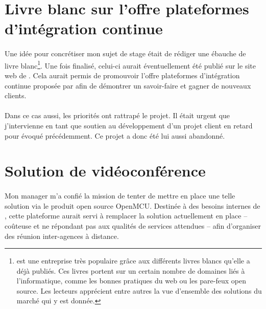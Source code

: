 \section{Livre blanc sur l'offre \og plateformes d'intégration continue \fg}

\paragraph{}
Une idée pour concrétiser mon sujet de stage était de rédiger une ébauche de livre blanc\footnote{\asmile{} est une entreprise très populaire grâce aux différents livres blancs qu'elle a déjà publiés. Ces livres portent sur un certain nombre de domaines liés à l'informatique, comme les bonnes pratiques du web ou les pare-feux open source. Les lecteurs apprécient entre autres la vue d'ensemble des solutions du marché qui y est donnée.}.
Une fois finalisé, celui-ci aurait éventuellement été publié sur le site web de \asmile.
Cela aurait permis de promouvoir l'offre \og plateformes d'intégration continue \fg{} proposée par \asmile{} afin de démontrer un savoir-faire et gagner de nouveaux clients.

\paragraph{}
Dans ce cas aussi, les priorités ont rattrapé le projet.
Il était urgent que j'intervienne en tant que soutien au développement d'un projet client en retard pour \abt{} évoqué précédemment.
Ce projet a donc été lui aussi abandonné.



\section{Solution de vidéoconférence}

\paragraph{}
Mon manager \apakou{} m'a confié la mission de tenter de mettre en place une telle solution via le produit open source OpenMCU.
Destinée à des besoins internes de \asmile, cette plateforme aurait servi à remplacer la solution actuellement en place -- coûteuse et ne répondant pas aux qualités de services attendues -- afin d'organiser des réunion inter-agences à distance.

